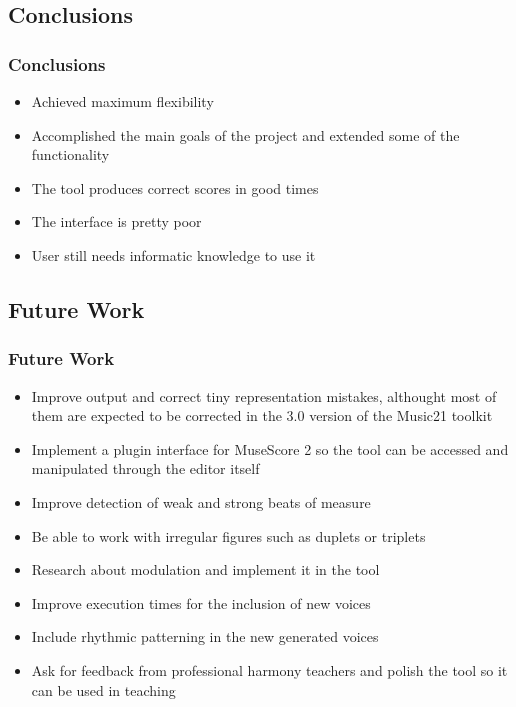 \documentclass[english]{beamer}
\begin{document}
\subsection{Conclusions}
		\begin{frame}
			\frametitle{Conclusions}
			\begin{itemize}
				\item<pro@1-> Achieved maximum flexibility
			      \item<pro@1-> Accomplished the main goals of the project and extended some of the functionality
			      \item<pro@1-> The tool produces correct scores in good times
			      \item<con@1-> The interface is pretty poor
			      \item<con@1-> User still needs informatic knowledge to use it
			    \end{itemize}
		\end{frame}

\subsection{Future Work}
	\begin{frame}
		\frametitle{Future Work}
		\begin{itemize}
			\item Improve output and correct tiny representation mistakes, althought most of them are expected to be corrected in the 3.0 version of the Music21 toolkit
			\item Implement a plugin interface for MuseScore 2 so the tool can be accessed and manipulated through the editor itself
			\item Improve detection of weak and strong beats of measure
			\item Be able to work with irregular figures such as duplets or triplets
			\item Research about modulation and implement it in the tool
			\item Improve execution times for the inclusion of new voices
			\item Include rhythmic patterning in the new generated voices
			\item Ask for feedback from professional harmony teachers and polish the tool so it can be used in teaching
		\end{itemize}
	\end{frame}
		
\end{document}
